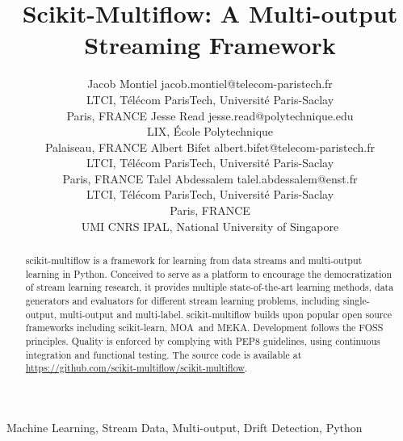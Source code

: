 \documentclass[twoside,11pt]{article}
\newcommand{\skmultiflow}{\textsf{scikit-multiflow}\xspace}
\newcommand{\sklearn}{\textsf{scikit-learn}\xspace}
\newcommand{\moa}{\textsf{MOA}\xspace}
\newcommand{\meka}{\textsf{MEKA}\xspace}
\begin{document}
\title{
Scikit-Multiflow: A Multi-output Streaming Framework
}

\author{\name Jacob Montiel \email jacob.montiel@telecom-paristech.fr \\
       \addr LTCI,
       Télécom ParisTech, Université Paris-Saclay\\
       Paris, FRANCE
       \AND
       \name Jesse Read \email jesse.read@polytechnique.edu \\
       \addr LIX, 
       École Polytechnique\\
       Palaiseau, FRANCE
       \AND
       \name Albert Bifet \email albert.bifet@telecom-paristech.fr \\
       \addr LTCI,
       Télécom ParisTech, Université Paris-Saclay\\
       Paris, FRANCE
       \AND
       \name Talel Abdessalem \email talel.abdessalem@enst.fr \\
       \addr LTCI, 
       Télécom ParisTech, Université Paris-Saclay\\
       Paris, FRANCE \\
       UMI CNRS IPAL, National University of Singapore
       }


\maketitle

\begin{abstract}%
\skmultiflow is a framework for learning from data streams and
multi-output learning in Python. Conceived to serve as a platform to encourage the democratization of stream learning research, it provides multiple state-of-the-art learning methods, data generators and evaluators for different stream learning problems, including single-output, multi-output and multi-label. \skmultiflow builds upon popular open source frameworks including \sklearn, \moa\ and \meka. Development follows the FOSS principles. Quality is enforced by complying with PEP8 guidelines, using continuous integration and functional testing. The source code is available at \url{https://github.com/scikit-multiflow/scikit-multiflow}.
\end{abstract}

\begin{keywords}
  Machine Learning, Stream Data, Multi-output, Drift Detection, Python
\end{keywords}
\end{document}
